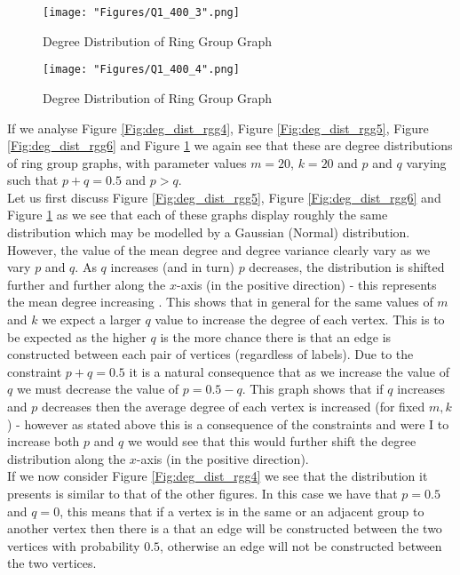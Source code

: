 \documentclass[12pt, a4paper]{article}
\begin{document}
\begin{figure}[!htb]
   \begin{minipage}{0.49\textwidth}
     \centering
     \texttt{[image: "Figures/Q1\_400\_3".png]}
     \caption{Degree Distribution of Ring Group Graph}
     \label{Fig:deg_dist_rgg6}
   \end{minipage}\hfill
   \begin{minipage}{0.49\textwidth}
     \centering
     \texttt{[image: "Figures/Q1\_400\_4".png]}
     \caption{Degree Distribution of Ring Group Graph}
     \label{Fig:deg_dist_rgg7}
   \end{minipage}
\end{figure}
If we analyse Figure \ref{Fig:deg_dist_rgg4}, Figure \ref{Fig:deg_dist_rgg5}, Figure \ref{Fig:deg_dist_rgg6} and Figure \ref{Fig:deg_dist_rgg7} we again see that these are degree distributions of ring group graphs, with parameter values $m=20$, $k=20$ and $p$ and $q$ varying such that $p+q =0.5$ and $p>q$.\\
Let us first discuss Figure \ref{Fig:deg_dist_rgg5}, Figure \ref{Fig:deg_dist_rgg6} and Figure \ref{Fig:deg_dist_rgg7} as we see that each of these graphs display roughly the same distribution which may be modelled by a Gaussian (Normal) distribution. However, the value of the mean degree and degree variance clearly vary as we vary $p$ and $q$. As $q$ increases (and in turn) $p$ decreases, the distribution is shifted further and further along the $x$-axis (in the positive direction) - this represents the mean degree increasing . This shows that in general for the same values of $m$ and $k$ we expect a larger $q$ value to increase the degree of each vertex. This is to be expected as the higher $q$ is the more chance there is that an edge is constructed between each pair of vertices (regardless of labels). Due to the constraint $p+q =0.5$ it is a natural consequence that as we increase the value of $q$ we must decrease the value of $p = 0.5 - q$. This graph shows that if $q$ increases and $p$ decreases then the average degree of each vertex is increased (for fixed $m, k$) - however as stated above this is a consequence of the constraints and were I to increase both $p$ and $q$ we would see that this would further shift the degree distribution along the $x$-axis (in the positive direction).\\
If we now consider Figure \ref{Fig:deg_dist_rgg4} we see that the distribution it presents is similar to that of the other figures. In this case we have that $p=0.5$ and $q=0$, this means that if a vertex is in the same or an adjacent group to another vertex then there is a that an edge will be constructed between the two vertices with probability $0.5$, otherwise an edge will not be constructed between the two vertices.\\
\end{document}
